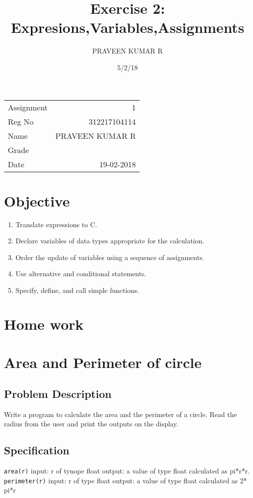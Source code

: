 \documentclass[11pt]{article}
\author{PRAVEEN KUMAR R}
\date{5/2/18}
\title{Exercise 2: Expresions,Variables,Assignments}
\begin{document}
\maketitle
\begin{export}
\linespread{1.2}
\end{export}
\begin{center}
\begin{tabular}{lr}
Assignment & 1\\
Reg No & 312217104114\\
Name & PRAVEEN KUMAR R\\
Grade & \\
Date & 19-02-2018\\
\end{tabular}
\end{center}


\section{Objective}
\label{sec-1}
\begin{enumerate}
\item Translate expressions to C.
\item Declare variables of data types appropriate for the calculation.
\item Order the update of variables using a sequence of assignments.
\item Use alternative and conditional statements.
\item Specify, define, and call simple functions.
\end{enumerate}

\section{Home work}
\label{sec-2}
\section{Area and Perimeter of circle}
\label{sec-3}

\subsection*{Problem Description}
\label{sec-3-1}
Write a program to calculate the area and the perimeter of a
circle. Read the radius from the user and print the outputs on the
display.

\subsection*{Specification}
\label{sec-3-2}
 \texttt{area(r)} 
  input: r of tynope float
  output: a value of type float calculated as pi*r*r.
\texttt{perimeter(r)}
  input: r of type float
  output: a value of type float calculated as 2* pi*r
\end{document}
